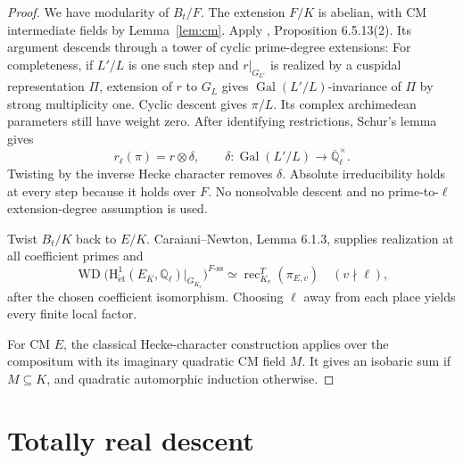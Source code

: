 \documentclass[11pt,a4paper]{article}
\theoremstyle{definition}\newtheorem{definition}[theorem]{Definition}
\theoremstyle{remark}\newtheorem*{remark}{Remark}
\newcommand{\Q}{\mathbb Q}\newcommand{\Z}{\mathbb Z}
\newcommand{\Gal}{\operatorname{Gal}}\newcommand{\Res}{\operatorname{Res}}
\newcommand{\WD}{\operatorname{WD}}\newcommand{\BC}{\operatorname{BC}}
\newcommand{\HH}{\mathrm H^1_{\mathrm{\acute et}}}
\begin{document}
\begin{proof}
We have modularity of \(B_t/F\). The extension \(F/K\) is abelian, with CM
intermediate fields by Lemma~\ref{lem:cm}. Apply \cite{ACC}, Proposition 6.5.13(2). Its argument descends through
a tower of cyclic prime-degree extensions: For completeness, if \(L'/L\) is one such step and
\(r|_{G_{L'}}\) is realized by a cuspidal representation \(\Pi\), extension of
\(r\) to \(G_L\) gives \(\Gal(L'/L)\)-invariance of \(\Pi\) by strong
multiplicity one. Cyclic descent gives \(\pi/L\). Its complex archimedean
parameters still have weight zero. After identifying restrictions,
Schur's lemma gives
\[
 r_\ell(\pi)=r\otimes\delta,\qquad
 \delta:\Gal(L'/L)\longrightarrow\overline{\Q}_\ell^\times.
\]
Twisting by the inverse Hecke character removes \(\delta\).
Absolute irreducibility holds at every step because it holds over \(F\).
No nonsolvable descent and no prime-to-\(\ell\) extension-degree assumption
is used.

Twist \(B_t/K\) back to \(E/K\). Caraiani--Newton, Lemma 6.1.3, supplies
realization at all coefficient primes and
\begin{equation}
 \WD\bigl(\HH(E_{\overline K},\Q_\ell)|_{G_{K_v}}\bigr)^{F\text{-ss}}
   \simeq \operatorname{rec}^{T}_{K_v}(\pi_{E,v})
   \quad(v\nmid\ell),                          \label{eq:local-compat}
\end{equation}
after the chosen coefficient isomorphism. Choosing \(\ell\) away from each
place yields every finite local factor.

For CM \(E\), the classical Hecke-character construction applies over the
compositum with its imaginary quadratic CM field \(M\). It gives an isobaric
sum if \(M\subseteq K\), and quadratic automorphic induction otherwise.
\end{proof}

\section{Totally real descent}\label{sec:TR}
\end{document}
